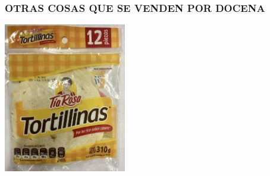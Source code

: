 \begin{frame}
  \frametitle{OTRAS COSAS QUE SE VENDEN POR DOCENA}

  \begin{center}
    \includegraphics[width=0.4\textwidth]{pic/tia-rosa.jpg}
  \end{center}
\end{frame}

